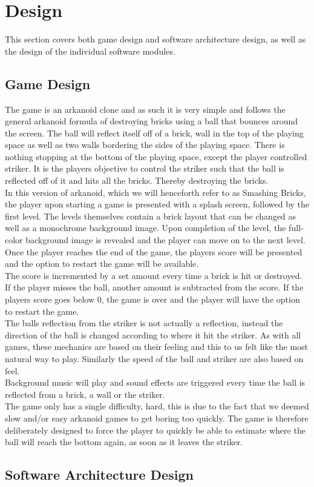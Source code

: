 \section{Design}
This section covers both game design and software architecture design, as well as the
design of the individual software modules.

\subsection{Game Design}
The game is an arkanoid clone and as such it is very simple and follows the general arkanoid formula of destroying
bricks using a ball that bounces around the screen. The ball will reflect itself off of a brick, wall
in the top of the playing space as well as two walls bordering the sides of the playing space.
There is nothing stopping at the bottom of the playing space, except the player controlled striker.
It is the players objective to control the striker such that the ball is reflected off of it and
hits all the bricks. Thereby destroying the bricks. \\

In this version of arkanoid, which we will henceforth refer to as Smashing Bricks, the player
upon starting a game is presented with a splash screen, followed by the first level. The levels
themselves contain a brick layout that can be changed as well as a monochrome background image.
Upon completion of the level, the full-color background image is revealed and the player can
move on to the next level. Once the player reaches the end of the game, the players score
will be presented and the option to restart the game will be available. \\

The score is incremented by a set amount every time a brick is hit or destroyed. If the player
misses the ball, another amount is subtracted from the score. If the players score goes below
0, the game is over and the player will have the option to restart the game. \\

The balls reflection from the striker is not actually a reflection, instead the direction
of the ball is changed according to where it hit the striker. As with all games, these
mechanics are based on their feeling and this to us felt like the most natural way to play.
Similarly the speed of the ball and striker are also based on feel. \\

Background music will play and sound effects are triggered every time the ball is reflected
from a brick, a wall or the striker. \\

The game only has a single difficulty, hard, this is due to the fact that we deemed slow and/or
easy arkanoid games to get boring too quickly. The game is therefore deliberately designed to 
force the player to quickly be able to estimate where the ball will reach the bottom again, as 
soon as it leaves the striker.

\subsection{Software Architecture Design}
